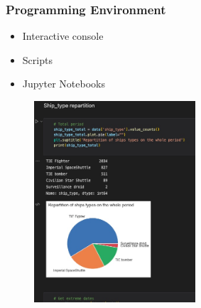 \begin{frame}\frametitle{Programming Environment}

   \begin{minipage}{0.4\linewidth}
      \begin{itemize}
         \item Interactive console   
         \item Scripts
         \item Jupyter Notebooks
      \end{itemize}
   \end{minipage}
   \begin{minipage}{0.58\linewidth}
      \begin{figure}[H]
         \includegraphics[width=6cm]{../images/illustrations/notebook.jpg}
      \end{figure}
   \end{minipage}
\end{frame}


